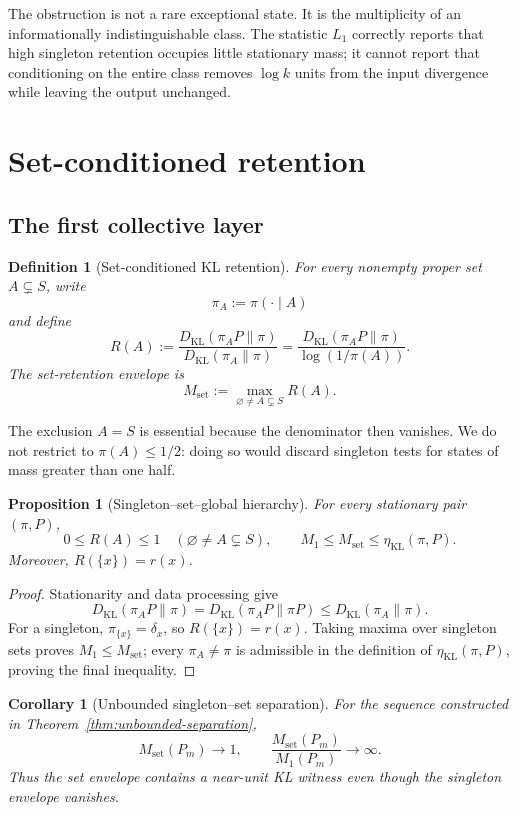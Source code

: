 \documentclass[11pt]{article}
\newtheorem{proposition}[theorem]{Proposition}
\newtheorem{corollary}[theorem]{Corollary}
\newtheorem{definition}[theorem]{Definition}
\newcommand{\KL}{D_{\mathrm{KL}}}
\newcommand{\etaStat}{\eta_{\mathrm{KL}}(\pi,P)}
\newcommand{\Mone}{M_1}
\newcommand{\Lone}{L_1}
\newcommand{\Mset}{M_{\mathrm{set}}}
\begin{document}
The obstruction is not a rare exceptional state.  It is the multiplicity
of an informationally indistinguishable class.  The statistic \(\Lone\)
correctly reports that high singleton retention occupies little stationary
mass; it cannot report that conditioning on the entire class removes
\(\log k\) units from the input divergence while leaving the output
unchanged.


\section{Set-conditioned retention}
\label{sec:set}

\subsection{The first collective layer}

\begin{definition}[Set-conditioned KL retention]
\label{def:set-retention}
For every nonempty proper set \(A\subsetneq S\), write
\[
  \pi_A:=\pi(\cdot\mid A)
\]
and define
\[
  R(A)
  :=
  \frac{\KL(\pi_AP\|\pi)}{\KL(\pi_A\|\pi)}
  =
  \frac{\KL(\pi_AP\|\pi)}{\log(1/\pi(A))}.
\]
The set-retention envelope is
\[
  \Mset:=
  \max_{\varnothing\ne A\subsetneq S}R(A).
\]
\end{definition}

The exclusion \(A=S\) is essential because the denominator then vanishes.
We do not restrict to \(\pi(A)\le1/2\): doing so would discard singleton
tests for states of mass greater than one half.

\begin{proposition}[Singleton--set--global hierarchy]
\label{prop:set-hierarchy}
For every stationary pair \((\pi,P)\),
\[
  0\le R(A)\le1
  \quad(\varnothing\ne A\subsetneq S),
  \qquad
  \Mone\le\Mset\le\etaStat.
\]
Moreover, \(R(\{x\})=r(x)\).
\end{proposition}

\begin{proof}
Stationarity and data processing give
\[
  \KL(\pi_AP\|\pi)
  =\KL(\pi_AP\|\pi P)
  \le\KL(\pi_A\|\pi).
\]
For a singleton, \(\pi_{\{x\}}=\delta_x\), so
\(R(\{x\})=r(x)\).  Taking maxima over singleton sets proves
\(\Mone\le\Mset\); every \(\pi_A\ne\pi\) is admissible in the definition
of \(\etaStat\), proving the final inequality.
\end{proof}

\begin{corollary}[Unbounded singleton--set separation]
\label{cor:singleton-set-separation}
For the sequence constructed in
Theorem~\ref{thm:unbounded-separation},
\[
  \Mset(P_m)\longrightarrow1,
  \qquad
  \frac{\Mset(P_m)}{\Mone(P_m)}\longrightarrow\infty.
\]
Thus the set envelope contains a near-unit KL witness even though the
singleton envelope vanishes.
\end{corollary}
\end{document}
